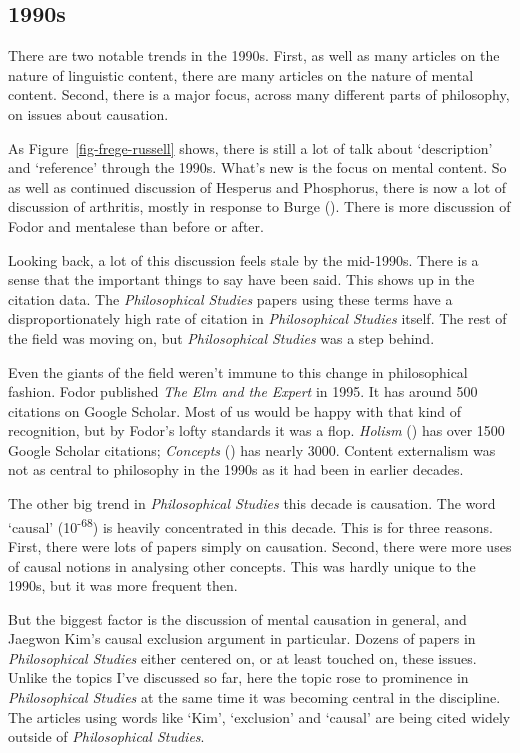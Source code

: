 \documentclass[
  10pt,
  letterpaper,
  DIV=11,
  numbers=noendperiod,
  twoside]{scrartcl}
\begin{document}
\subsection{1990s}\label{sec-1990s-articles}

There are two notable trends in the 1990s. First, as well as many
articles on the nature of linguistic content, there are many articles on
the nature of mental content. Second, there is a major focus, across
many different parts of philosophy, on issues about causation.

As Figure~\ref{fig-frege-russell} shows, there is still a lot of talk
about `description' and `reference' through the 1990s. What's new is the
focus on mental content. So as well as continued discussion of Hesperus
and Phosphorus, there is now a lot of discussion of arthritis, mostly in
response to Burge (). There is
more discussion of Fodor and mentalese than before or after.

Looking back, a lot of this discussion feels stale by the mid-1990s.
There is a sense that the important things to say have been said. This
shows up in the citation data. The \emph{Philosophical Studies} papers
using these terms have a disproportionately high rate of citation in
\emph{Philosophical Studies} itself. The rest of the field was moving
on, but \emph{Philosophical Studies} was a step behind.

Even the giants of the field weren't immune to this change in
philosophical fashion. Fodor published \emph{The Elm and the Expert} in
1995. It has around 500 citations on Google Scholar. Most of us would be
happy with that kind of recognition, but by Fodor's lofty standards it
was a flop. \emph{Holism} () has over 1500 Google Scholar citations; \emph{Concepts}
() has nearly 3000. Content
externalism was not as central to philosophy in the 1990s as it had been
in earlier decades.

The other big trend in \emph{Philosophical Studies} this decade is
causation. The word `causal' (10\textsuperscript{-68}) is heavily
concentrated in this decade. This is for three reasons. First, there
were lots of papers simply on causation. Second, there were more uses of
causal notions in analysing other concepts. This was hardly unique to
the 1990s, but it was more frequent then.

But the biggest factor is the discussion of mental causation in general,
and Jaegwon Kim's causal exclusion argument in particular. Dozens of
papers in \emph{Philosophical Studies} either centered on, or at least
touched on, these issues. Unlike the topics I've discussed so far, here
the topic rose to prominence in \emph{Philosophical Studies} at the same
time it was becoming central in the discipline. The articles using words
like `Kim', `exclusion' and `causal' are being cited widely outside of
\emph{Philosophical Studies}.
\end{document}
